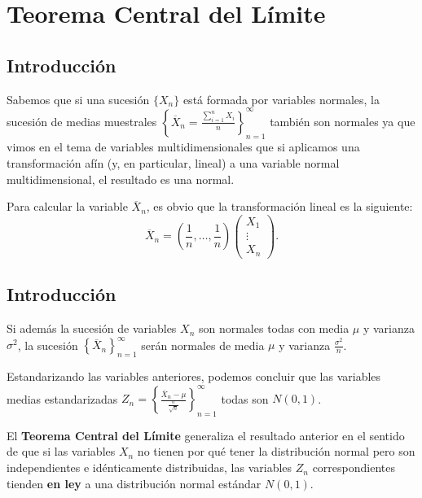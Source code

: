 \documentclass[]{book}
\begin{document}
\hypertarget{teorema-central-del-luxedmite}{%
\section{Teorema Central del Límite}\label{teorema-central-del-luxedmite}}

\hypertarget{introducciuxf3n-16}{%
\subsection{Introducción}\label{introducciuxf3n-16}}

Sabemos que si una sucesión \(\{X_n\}\) está formada por variables normales, la sucesión de medias muestrales \(\left\{\overline{X}_n=\frac{\sum\limits_{i=1}^n X_i}{n}\right\}_{n=1}^\infty\) también son normales ya que vimos en el tema de variables multidimensionales que si aplicamos una transformación afín (y, en particular, lineal) a una variable normal multidimensional, el resultado es una normal.

Para calcular la variable \(\overline{X}_n\), es obvio que la transformación lineal es la siguiente:
\[
\overline{X}_n = \left(\frac{1}{n},\ldots,\frac{1}{n}\right)\begin{pmatrix}X_1 \\\vdots\\ X_n\end{pmatrix}.
\]

\hypertarget{introducciuxf3n-17}{%
\subsection{Introducción}\label{introducciuxf3n-17}}

Si además la sucesión de variables \(X_n\) son normales todas con media \(\mu\) y varianza \(\sigma^2\), la sucesión \(\left\{\overline{X}_n\right\}_{n=1}^\infty\) serán normales de media \(\mu\) y varianza \(\frac{\sigma^2}{n}\).

Estandarizando las variables anteriores, podemos concluir que las variables medias estandarizadas \(Z_n =\left\{\frac{\overline{X}_n-\mu}{\frac{\sigma}{\sqrt{n}}}\right\}_{n=1}^\infty\) todas son \(N(0,1)\).

El \textbf{Teorema Central del Límite} generaliza el resultado anterior en el sentido de que si las variables \(X_n\) no tienen por qué tener la distribución normal pero son independientes e idénticamente distribuidas, las variables \(Z_n\) correspondientes tienden \textbf{en ley} a una distribución normal estándar \(N(0,1)\).
\end{document}

